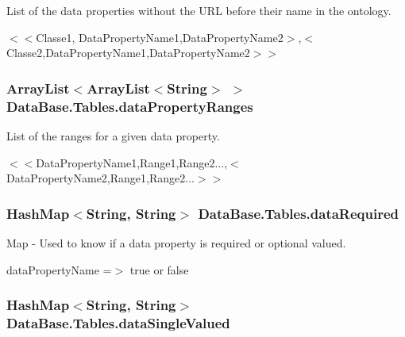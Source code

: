 List of the data properties without the URL before their name in the ontology. 

$<$$<$Classe1, DataPropertyName1,DataPropertyName2$>$,$<$Classe2,DataPropertyName1,DataPropertyName2$>$$>$ \hypertarget{class_data_base_1_1_tables_ac4fac81e62e9331f412a2ede3ddcc502}{
\subsubsection[{dataPropertyRanges}]{\setlength{\rightskip}{0pt plus 5cm}ArrayList$<$ArrayList$<$String$>$ $>$ {\bf DataBase.Tables.dataPropertyRanges}}}
\label{class_data_base_1_1_tables_ac4fac81e62e9331f412a2ede3ddcc502}


List of the ranges for a given data property. 

$<$$<$DataPropertyName1,Range1,Range2...,$<$DataPropertyName2,Range1,Range2...$>$$>$ \hypertarget{class_data_base_1_1_tables_af968a71b80946ad236d287dad7a68774}{
\subsubsection[{dataRequired}]{\setlength{\rightskip}{0pt plus 5cm}HashMap$<$String, String$>$ {\bf DataBase.Tables.dataRequired}}}
\label{class_data_base_1_1_tables_af968a71b80946ad236d287dad7a68774}


Map -\/ Used to know if a data property is required or optional valued. 

dataPropertyName =$>$ true or false \hypertarget{class_data_base_1_1_tables_a40e2a6f8f60048f0a393e9d03e8fcfd8}{
\subsubsection[{dataSingleValued}]{\setlength{\rightskip}{0pt plus 5cm}HashMap$<$String, String$>$ {\bf DataBase.Tables.dataSingleValued}}}
\label{class_data_base_1_1_tables_a40e2a6f8f60048f0a393e9d03e8fcfd8}


